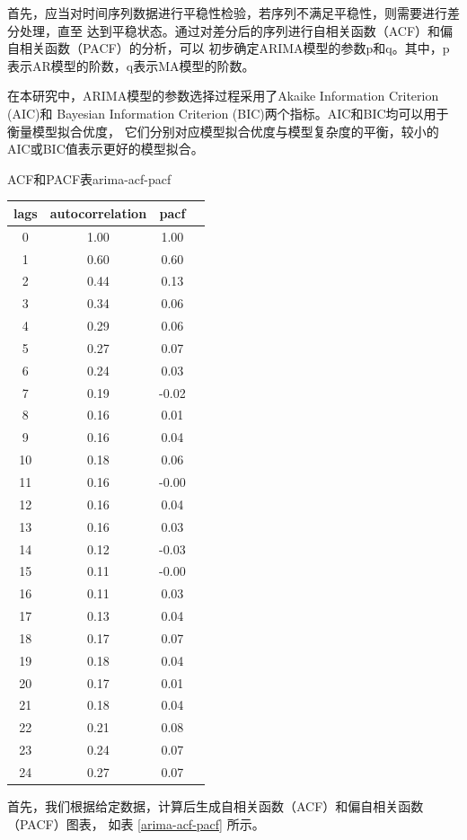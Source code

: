 \documentclass[a4paper,AutoFakeBold,oneside,12pt]{book}
\begin{document}
首先，应当对时间序列数据进行平稳性检验，若序列不满足平稳性，则需要进行差分处理，直至
达到平稳状态。通过对差分后的序列进行自相关函数（ACF）和偏自相关函数（PACF）的分析，可以
初步确定ARIMA模型的参数p和q。其中，p表示AR模型的阶数，q表示MA模型的阶数。

在本研究中，ARIMA模型的参数选择过程采用了Akaike Information Criterion (AIC)和
Bayesian Information Criterion (BIC)两个指标。AIC和BIC均可以用于衡量模型拟合优度，
它们分别对应模型拟合优度与模型复杂度的平衡，较小的AIC或BIC值表示更好的模型拟合。


\begin{bupttable}{ACF和PACF表}{arima-acf-pacf}
	\begin{tabular}{cccc}
	\hline
	lags & autocorrelation & pacf \\
	\hline
	0  & 1.00 & 1.00 \\
	1  & 0.60 & 0.60 \\
	2  & 0.44 & 0.13 \\
	3  & 0.34 & 0.06 \\
	4  & 0.29 & 0.06 \\
	5  & 0.27 & 0.07 \\
	6  & 0.24 & 0.03 \\
	7  & 0.19 & -0.02 \\
	8  & 0.16 & 0.01 \\
	9  & 0.16 & 0.04 \\
	10 & 0.18 & 0.06 \\
	11 & 0.16 & -0.00 \\
	12 & 0.16 & 0.04 \\
	13 & 0.16 & 0.03 \\
	14 & 0.12 & -0.03 \\
	15 & 0.11 & -0.00 \\
	16 & 0.11 & 0.03 \\
	17 & 0.13 & 0.04 \\
	18 & 0.17 & 0.07 \\
	19 & 0.18 & 0.04 \\
	20 & 0.17 & 0.01 \\
	21 & 0.18 & 0.04 \\
	22 & 0.21 & 0.08 \\
	23 & 0.24 & 0.07 \\
	24 & 0.27 & 0.07 \\
	\hline
	\end{tabular}
\end{bupttable}

首先，我们根据给定数据，计算后生成自相关函数（ACF）和偏自相关函数（PACF）图表，
如表 \ref{arima-acf-pacf} 所示。
\end{document}
